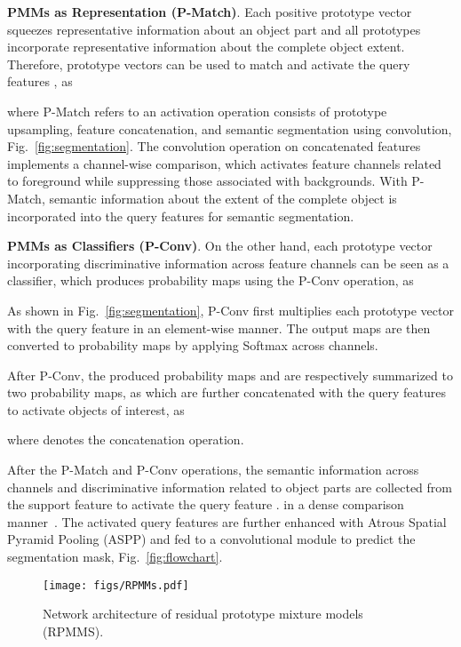 \documentclass[runningheads]{llncs}
\begin{document}
\textbf{PMMs as Representation (P-Match)}. 
Each positive prototype vector squeezes representative information about an object part and all prototypes incorporate representative information about the complete object extent. 
Therefore, prototype vectors can be used to match and activate the query features , as

where P-Match refers to an activation operation consists of prototype upsampling, feature concatenation, and semantic segmentation using convolution, Fig.\ \ref{fig:segmentation}.
The convolution operation on concatenated features implements a channel-wise comparison, which activates feature channels related to foreground while suppressing those associated with backgrounds. With P-Match, semantic information about the extent of the complete object is incorporated into the query features for semantic segmentation.

\textbf{PMMs as Classifiers (P-Conv)}. 
On the other hand, each prototype vector incorporating discriminative information across feature channels can be seen as a classifier, which produces probability maps  using the P-Conv operation, as

As shown in Fig.\ \ref{fig:segmentation}, P-Conv first multiplies each prototype vector with the query feature  in an element-wise manner. The output maps are then converted to probability maps  by applying Softmax across channels.

After P-Conv, the produced probability maps  and  are respectively summarized to two probability maps, as 
which are further concatenated with the query features to activate objects of interest, as 

where  denotes the concatenation operation. 


After the P-Match and P-Conv operations, the semantic information across channels and discriminative information related to object parts are collected from the support feature  to activate the query feature . in a dense comparison manner~\cite{CaNet}. The activated query features  are further enhanced with Atrous Spatial Pyramid Pooling (ASPP) and fed to a convolutional module to predict the segmentation mask, Fig.\ \ref{fig:flowchart}. 



\begin{figure}[t]
\centering
\texttt{[image: figs/RPMMs.pdf]}
\caption{Network architecture of residual prototype mixture models (RPMMS).}
\label{fig:residual}
\vspace{-0.2cm}
\end{figure}
\end{document}
